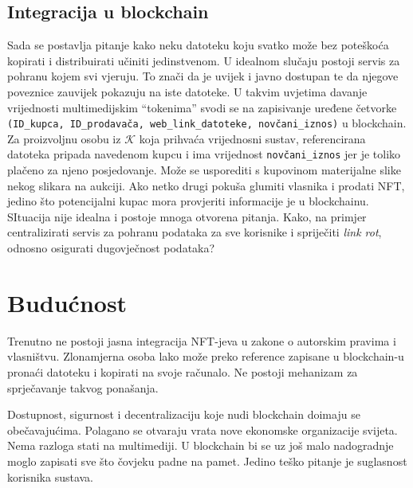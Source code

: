 \documentclass[12pt]{scrartcl} %
\newcommand{\korisnici}{\mathcal{K}}
\begin{document}
\subsection{Integracija u blockchain}

Sada se postavlja pitanje kako neku datoteku koju svatko može bez poteškoća kopirati i distribuirati učiniti jedinstvenom. U idealnom slučaju postoji servis za pohranu kojem svi vjeruju. To znači da je uvijek i javno dostupan te da njegove poveznice zauvijek pokazuju na iste datoteke. U takvim uvjetima davanje vrijednosti multimedijskim \enquote{tokenima} svodi se na zapisivanje uređene četvorke \texttt{(ID\_kupca, ID\_prodavača, web\_link\_datoteke, novčani\_iznos)} u blockchain. Za proizvoljnu osobu iz $\korisnici$ koja prihvaća vrijednosni sustav, referencirana datoteka pripada navedenom kupcu i ima vrijednost \texttt{novčani\_iznos} jer je toliko plačeno za njeno posjedovanje. Može se usporediti s kupovinom materijalne slike nekog slikara na aukciji. Ako netko drugi pokuša glumiti vlasnika i prodati NFT, jedino što potencijalni kupac mora provjeriti informacije je u blockchainu. 
SItuacija nije idealna i postoje mnoga otvorena pitanja. Kako, na primjer centralizirati servis za pohranu podataka za sve korisnike i spriječiti \emph{link rot}, odnosno osigurati dugovječnost podataka? 

\section{Budućnost}

Trenutno ne postoji jasna integracija NFT-jeva u zakone o autorskim pravima i vlasništvu. Zlonamjerna osoba lako može preko reference zapisane u blockchain-u pronaći datoteku i kopirati na svoje računalo. Ne postoji mehanizam za sprječavanje takvog ponašanja. 

Dostupnost, sigurnost i decentralizaciju koje nudi blockchain doimaju se obečavajućima. Polagano se otvaraju vrata nove ekonomske organizacije svijeta. Nema razloga stati na multimediji. U blockchain bi se uz još malo nadogradnje moglo zapisati sve što čovjeku padne na pamet. Jedino teško pitanje je suglasnost korisnika sustava.
\end{document}
